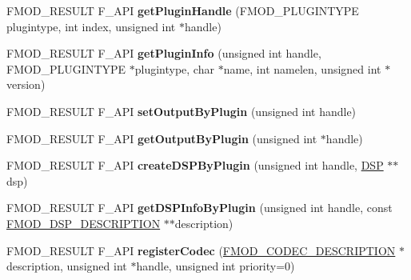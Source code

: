 \begin{DoxyCompactItemize}
\item 
\hypertarget{class_f_m_o_d_1_1_system_aa94d36d0d28721e35ec47fb1ef06ce1f}{F\+M\+O\+D\+\_\+\+R\+E\+S\+U\+L\+T F\+\_\+\+A\+P\+I {\bfseries get\+Plugin\+Handle} (F\+M\+O\+D\+\_\+\+P\+L\+U\+G\+I\+N\+T\+Y\+P\+E plugintype, int index, unsigned int $\ast$handle)}\label{class_f_m_o_d_1_1_system_aa94d36d0d28721e35ec47fb1ef06ce1f}

\item 
\hypertarget{class_f_m_o_d_1_1_system_a68da30ad69d2f9320ddbdc4ced35fec1}{F\+M\+O\+D\+\_\+\+R\+E\+S\+U\+L\+T F\+\_\+\+A\+P\+I {\bfseries get\+Plugin\+Info} (unsigned int handle, F\+M\+O\+D\+\_\+\+P\+L\+U\+G\+I\+N\+T\+Y\+P\+E $\ast$plugintype, char $\ast$name, int namelen, unsigned int $\ast$version)}\label{class_f_m_o_d_1_1_system_a68da30ad69d2f9320ddbdc4ced35fec1}

\item 
\hypertarget{class_f_m_o_d_1_1_system_a014b2d9623aca816e8054867517067ff}{F\+M\+O\+D\+\_\+\+R\+E\+S\+U\+L\+T F\+\_\+\+A\+P\+I {\bfseries set\+Output\+By\+Plugin} (unsigned int handle)}\label{class_f_m_o_d_1_1_system_a014b2d9623aca816e8054867517067ff}

\item 
\hypertarget{class_f_m_o_d_1_1_system_a4fc02b0d0253fb9c16427393d25bad59}{F\+M\+O\+D\+\_\+\+R\+E\+S\+U\+L\+T F\+\_\+\+A\+P\+I {\bfseries get\+Output\+By\+Plugin} (unsigned int $\ast$handle)}\label{class_f_m_o_d_1_1_system_a4fc02b0d0253fb9c16427393d25bad59}

\item 
\hypertarget{class_f_m_o_d_1_1_system_a3b6b43cfc7eced0c0babf56403d91f6f}{F\+M\+O\+D\+\_\+\+R\+E\+S\+U\+L\+T F\+\_\+\+A\+P\+I {\bfseries create\+D\+S\+P\+By\+Plugin} (unsigned int handle, \hyperlink{class_f_m_o_d_1_1_d_s_p}{D\+S\+P} $\ast$$\ast$dsp)}\label{class_f_m_o_d_1_1_system_a3b6b43cfc7eced0c0babf56403d91f6f}

\item 
\hypertarget{class_f_m_o_d_1_1_system_ade2dc1c4b0ce419ade897ad06ee524a4}{F\+M\+O\+D\+\_\+\+R\+E\+S\+U\+L\+T F\+\_\+\+A\+P\+I {\bfseries get\+D\+S\+P\+Info\+By\+Plugin} (unsigned int handle, const \hyperlink{struct_f_m_o_d___d_s_p___d_e_s_c_r_i_p_t_i_o_n}{F\+M\+O\+D\+\_\+\+D\+S\+P\+\_\+\+D\+E\+S\+C\+R\+I\+P\+T\+I\+O\+N} $\ast$$\ast$description)}\label{class_f_m_o_d_1_1_system_ade2dc1c4b0ce419ade897ad06ee524a4}

\item 
\hypertarget{class_f_m_o_d_1_1_system_af2d0ac8c44aa4ac6f4ba67e6004dcad6}{F\+M\+O\+D\+\_\+\+R\+E\+S\+U\+L\+T F\+\_\+\+A\+P\+I {\bfseries register\+Codec} (\hyperlink{struct_f_m_o_d___c_o_d_e_c___d_e_s_c_r_i_p_t_i_o_n}{F\+M\+O\+D\+\_\+\+C\+O\+D\+E\+C\+\_\+\+D\+E\+S\+C\+R\+I\+P\+T\+I\+O\+N} $\ast$description, unsigned int $\ast$handle, unsigned int priority=0)}\label{class_f_m_o_d_1_1_system_af2d0ac8c44aa4ac6f4ba67e6004dcad6}


\end{DoxyCompactItemize}

